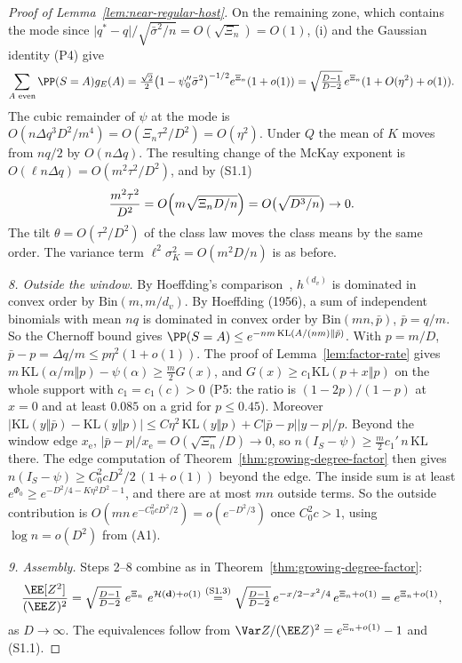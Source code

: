 \begin{proof}[Proof of Lemma~\ref{lem:near-regular-host}]
On the remaining zone, which contains the mode since
\(\lvert q^*-q\rvert/\sqrt{\bar\sigma^2/n}=O(\sqrt{\Xi_n})=O(1)\), (i) and the
Gaussian identity (P4) give
\[
\sum_{A\text{ even}}\PP(S=A)g_E(A)
=\tfrac{\sqrt2}2\bigl(1-\psi''_0\bar\sigma^2\bigr)^{-1/2}e^{\Xi_n}(1+o(1))
=\sqrt{\tfrac{D-1}{D-2}}\,e^{\Xi_n}(1+O(\eta^2)+o(1)).
\]
The cubic remainder of \(\psi\) at the mode is
\(O(n\Delta q^3D^2/m^4)=O(\Xi_n\tau^2/D^2)=O(\eta^2)\).
Under \(Q\) the mean of \(K\) moves from \(nq/2\) by \(O(n\Delta q)\). The resulting change of
the McKay exponent is \(O(\ell n\Delta q)=O(m^2\tau^2/D^2)\), and by (S1.1)
\[
\frac{m^2\tau^2}{D^2}=O\Bigl(m\sqrt{\Xi_nD/n}\Bigr)=O\bigl(\sqrt{D^3/n}\bigr)\to0 .
\]
The tilt \(\theta=O(\tau^2/D^2)\) of the class law moves the class means by
the same order. The variance term \(\ell^2\sigma_K^2=O(m^2D/n)\) is as before.

\emph{8. Outside the window.} By Hoeffding's comparison~\cite{Hoeffding63},
\(h^{(d_v)}\) is dominated in convex order by \(\mathrm{Bin}(m,m/d_v)\). By
Hoeffding (1956), a sum of independent binomials with mean \(nq\) is dominated
in convex order by \(\mathrm{Bin}(mn,\bar p)\), \(\bar p=q/m\). So the Chernoff
bound gives \(\PP(S=A)\le e^{-nm\,\mathrm{KL}(A/(nm)\Vert\bar p)}\). With \(p=m/D\),
\(\bar p-p=\Delta q/m\le p\eta^2(1+o(1))\). The proof of
Lemma~\ref{lem:factor-rate} gives
\(m\,\mathrm{KL}(\alpha/m\Vert p)-\psi(\alpha)\ge\tfrac m2G(x)\), and
\(G(x)\ge c_1\mathrm{KL}(p+x\Vert p)\) on the whole support with \(c_1=c_1(c)>0\)
(P5: the ratio is \((1-2p)/(1-p)\) at \(x=0\) and at least \(0.085\) on a grid
for \(p\le0.45\)). Moreover
\(\lvert\mathrm{KL}(y\Vert\bar p)-\mathrm{KL}(y\Vert p)\rvert
\le C\eta^2\,\mathrm{KL}(y\Vert p)+C\lvert\bar p-p\rvert\lvert y-p\rvert/p\).
Beyond the window edge \(x_{\mathrm e}\), \(\lvert\bar p-p\rvert/x_{\mathrm e}=O(\sqrt{\Xi_n}/D)\to0\),
so \(n(I_S-\psi)\ge\tfrac m2c_1'\,n\,\mathrm{KL}\) there. The edge computation of
Theorem~\ref{thm:growing-degree-factor} then gives
\(n(I_S-\psi)\ge C_0^2cD^2/2\,(1+o(1))\) beyond the edge.
The inside sum is at least \(e^{\Phi_0}\ge e^{-D^2/4-K\eta^2D^2-1}\), and there are
at most \(mn\) outside terms. So the outside contribution is
\(O(mn\,e^{-C_0^2cD^2/2})=o(e^{-D^2/3})\) once \(C_0^2c>1\), using
\(\log n=o(D^2)\) from (A1).

\emph{9. Assembly.} Steps 2--8 combine as in
Theorem~\ref{thm:growing-degree-factor}:
\[
\frac{\EE[Z^2]}{(\EE Z)^2}
=\sqrt{\tfrac{D-1}{D-2}}\;e^{\Xi_n}\;e^{\mathcal H(\mathbf d)+o(1)}
\overset{\text{(S1.3)}}{=}
\sqrt{\tfrac{D-1}{D-2}}\,e^{-x/2-x^2/4}\,e^{\Xi_n+o(1)}
=e^{\Xi_n+o(1)},
\]
as \(D\to\infty\). The equivalences follow from \(\Var Z/(\EE Z)^2=e^{\Xi_n+o(1)}-1\) and (S1.1).
\end{proof}

